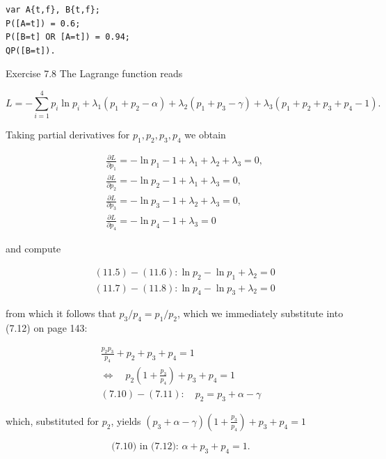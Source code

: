 \documentclass[10pt]{article}
\begin{document}
\begin{verbatim}
var A{t,f}, B{t,f};
P([A=t]) = 0.6;
P([B=t] OR [A=t]) = 0.94;
QP([B=t]).
\end{verbatim}

Exercise 7.8 The Lagrange function reads


\begin{equation*}
L=-\sum_{i=1}^{4} p_{i} \ln p_{i}+\lambda_{1}\left(p_{1}+p_{2}-\alpha\right)+\lambda_{2}\left(p_{1}+p_{3}-\gamma\right)+\lambda_{3}\left(p_{1}+p_{2}+p_{3}+p_{4}-1\right) . \tag{11.4}
\end{equation*}


Taking partial derivatives for $p_{1}, p_{2}, p_{3}, p_{4}$ we obtain


\begin{align*}
& \frac{\partial L}{\partial p_{1}}=-\ln p_{1}-1+\lambda_{1}+\lambda_{2}+\lambda_{3}=0,  \tag{11.5}\\
& \frac{\partial L}{\partial p_{2}}=-\ln p_{2}-1+\lambda_{1}+\lambda_{3}=0,  \tag{11.6}\\
& \frac{\partial L}{\partial p_{3}}=-\ln p_{3}-1+\lambda_{2}+\lambda_{3}=0,  \tag{11.7}\\
& \frac{\partial L}{\partial p_{4}}=-\ln p_{4}-1+\lambda_{3}=0 \tag{11.8}
\end{align*}


and compute


\begin{align*}
& (11.5)-(11.6): \ln p_{2}-\ln p_{1}+\lambda_{2}=0  \tag{11.9}\\
& (11.7)-(11.8): \ln p_{4}-\ln p_{3}+\lambda_{2}=0 \tag{11.10}
\end{align*}


from which it follows that $p_{3} / p_{4}=p_{1} / p_{2}$, which we immediately substitute into (7.12) on page 143:


\begin{gather*}
\frac{p_{2} p_{3}}{p_{4}}+p_{2}+p_{3}+p_{4}=1 \\
\Leftrightarrow \quad p_{2}\left(1+\frac{p_{3}}{p_{4}}\right)+p_{3}+p_{4}=1  \tag{11.11}\\
(7.10)-(7.11): \quad p_{2}=p_{3}+\alpha-\gamma
\end{gather*}


which, substituted for $p_{2}$, yields $\left(p_{3}+\alpha-\gamma\right)\left(1+\frac{p_{3}}{p_{4}}\right)+p_{3}+p_{4}=1$


\begin{equation*}
\text { (7.10) in (7.12): } \alpha+p_{3}+p_{4}=1 \text {. } \tag{11.12}
\end{equation*}
\end{document}
